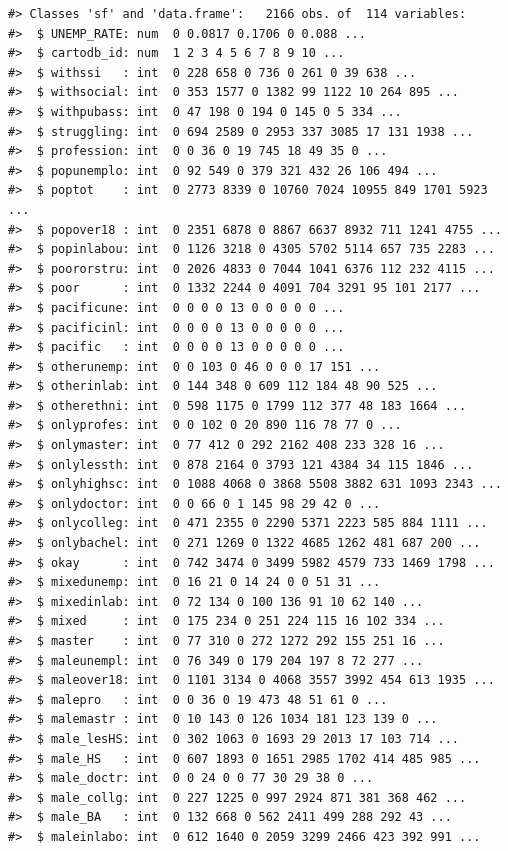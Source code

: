 \documentclass[
  11pt,
]{book}
\begin{document}
\begin{verbatim}
#> Classes 'sf' and 'data.frame':   2166 obs. of  114 variables:
#>  $ UNEMP_RATE: num  0 0.0817 0.1706 0 0.088 ...
#>  $ cartodb_id: num  1 2 3 4 5 6 7 8 9 10 ...
#>  $ withssi   : int  0 228 658 0 736 0 261 0 39 638 ...
#>  $ withsocial: int  0 353 1577 0 1382 99 1122 10 264 895 ...
#>  $ withpubass: int  0 47 198 0 194 0 145 0 5 334 ...
#>  $ struggling: int  0 694 2589 0 2953 337 3085 17 131 1938 ...
#>  $ profession: int  0 0 36 0 19 745 18 49 35 0 ...
#>  $ popunemplo: int  0 92 549 0 379 321 432 26 106 494 ...
#>  $ poptot    : int  0 2773 8339 0 10760 7024 10955 849 1701 5923 ...
#>  $ popover18 : int  0 2351 6878 0 8867 6637 8932 711 1241 4755 ...
#>  $ popinlabou: int  0 1126 3218 0 4305 5702 5114 657 735 2283 ...
#>  $ poororstru: int  0 2026 4833 0 7044 1041 6376 112 232 4115 ...
#>  $ poor      : int  0 1332 2244 0 4091 704 3291 95 101 2177 ...
#>  $ pacificune: int  0 0 0 0 13 0 0 0 0 0 ...
#>  $ pacificinl: int  0 0 0 0 13 0 0 0 0 0 ...
#>  $ pacific   : int  0 0 0 0 13 0 0 0 0 0 ...
#>  $ otherunemp: int  0 0 103 0 46 0 0 0 17 151 ...
#>  $ otherinlab: int  0 144 348 0 609 112 184 48 90 525 ...
#>  $ otherethni: int  0 598 1175 0 1799 112 377 48 183 1664 ...
#>  $ onlyprofes: int  0 0 102 0 20 890 116 78 77 0 ...
#>  $ onlymaster: int  0 77 412 0 292 2162 408 233 328 16 ...
#>  $ onlylessth: int  0 878 2164 0 3793 121 4384 34 115 1846 ...
#>  $ onlyhighsc: int  0 1088 4068 0 3868 5508 3882 631 1093 2343 ...
#>  $ onlydoctor: int  0 0 66 0 1 145 98 29 42 0 ...
#>  $ onlycolleg: int  0 471 2355 0 2290 5371 2223 585 884 1111 ...
#>  $ onlybachel: int  0 271 1269 0 1322 4685 1262 481 687 200 ...
#>  $ okay      : int  0 742 3474 0 3499 5982 4579 733 1469 1798 ...
#>  $ mixedunemp: int  0 16 21 0 14 24 0 0 51 31 ...
#>  $ mixedinlab: int  0 72 134 0 100 136 91 10 62 140 ...
#>  $ mixed     : int  0 175 234 0 251 224 115 16 102 334 ...
#>  $ master    : int  0 77 310 0 272 1272 292 155 251 16 ...
#>  $ maleunempl: int  0 76 349 0 179 204 197 8 72 277 ...
#>  $ maleover18: int  0 1101 3134 0 4068 3557 3992 454 613 1935 ...
#>  $ malepro   : int  0 0 36 0 19 473 48 51 61 0 ...
#>  $ malemastr : int  0 10 143 0 126 1034 181 123 139 0 ...
#>  $ male_lesHS: int  0 302 1063 0 1693 29 2013 17 103 714 ...
#>  $ male_HS   : int  0 607 1893 0 1651 2985 1702 414 485 985 ...
#>  $ male_doctr: int  0 0 24 0 0 77 30 29 38 0 ...
#>  $ male_collg: int  0 227 1225 0 997 2924 871 381 368 462 ...
#>  $ male_BA   : int  0 132 668 0 562 2411 499 288 292 43 ...
#>  $ maleinlabo: int  0 612 1640 0 2059 3299 2466 423 392 991 ...

\end{verbatim}
\end{document}
